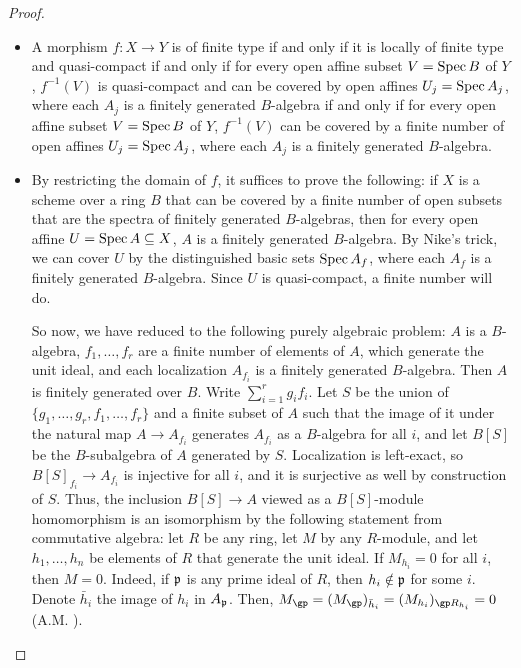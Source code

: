 \documentclass[a4paper]{article}
\begin{document}
\begin{enumerate} [label=\textbf{\arabic*.}, leftmargin=0em]
\begin{proof}
\begin{itemize} [leftmargin=0cm]
                  \item[(b)] A morphism $f : X \to Y$ is of finite type if and only if it is locally of finite type and quasi-compact if and only if for every open affine subset $V = \operatorname{Spec}{B}$ of $Y$, $f^{-1}(V)$ is quasi-compact and can be covered by open affines $U_j = \operatorname{Spec}{A_j}$, where each $A_j$ is a finitely generated $B$-algebra if and only if for every open affine subset $V = \operatorname{Spec}{B}$ of $Y$, $f^{-1}(V)$ can be covered by a finite number of open affines $U_j = \operatorname{Spec}{A_j}$, where each $A_j$ is a finitely generated $B$-algebra.

                  \item[(c)] By restricting the domain of $f$, it suffices to prove the following: if $X$ is a scheme over a ring $B$ that can be covered by a finite number of open subsets that are the spectra of finitely generated $B$-algebras, then for every open affine $U = \operatorname{Spec}{A} \subseteq X$, $A$ is a finitely generated $B$-algebra. By Nike's trick, we can cover $U$ by the distinguished basic sets $\operatorname{Spec}{A_f}$, where each $A_f$ is a finitely generated $B$-algebra. Since $U$ is quasi-compact, a finite number will do.

                        So now, we have reduced to the following purely algebraic problem: $A$ is a $B$-algebra, $f_1, \dots, f_r$ are a finite number of elements of $A$, which generate the unit ideal, and each localization $A_{f_i}$ is a finitely generated $B$-algebra.
                        Then $A$ is finitely generated over $B$.
                        Write $\sum_{i = 1}^r g_i f_i$.
                        Let $S$ be the union of $\{ g_1, \dots, g_r, f_1, \dots, f_r \}$ and a finite subset of $A$ such that the image of it under the natural map $A \to A_{f_i}$ generates $A_{f_i}$ as a $B$-algebra for all $i$, and let $B[S]$ be the $B$-subalgebra of $A$ generated by $S$.
                        Localization is left-exact, so $B[S]_{f_i} \to A_{f_i}$ is injective for all $i$, and it is surjective as well by construction of $S$.
                        Thus, the inclusion $B[S] \to A$ viewed as a $B[S]$-module homomorphism is an isomorphism by the following statement from commutative algebra: let $R$ be any ring, let $M$ by any $R$-module, and let $h_1, \dots, h_n$ be elements of $R$ that generate the unit ideal.
                        If $M_{h_i} = 0$ for all $i$, then $M = 0$. Indeed, if $\mathfrak{p}$ is any prime ideal of $R$, then $h_i \notin \mathfrak{p}$ for some $i$.
                        Denote $\bar{h}_i$ the image of $h_i$ in $A_{\mathfrak{p}}$.
                        Then, $M_{\gp} = (M_\gp)_{\bar{h}_i} = (M_{h_i})_{\gp R_{h_i}} = 0$ (A.M. ).
              \end{itemize}
          \end{proof}


\end{enumerate}
\end{document}
